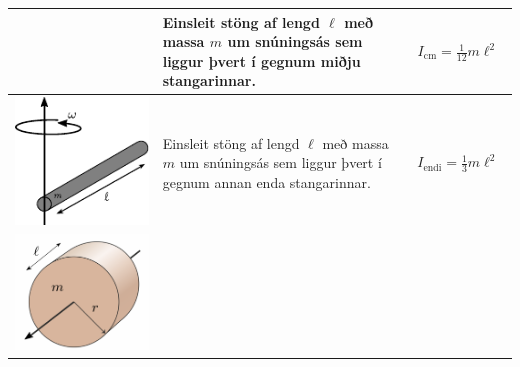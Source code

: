 \begin{table}[h!]
\begin{tabular}{ | c | m{5cm} | m{5cm} | }
\begin{minipage}{.3\textwidth}
      \vspace{0.3cm}
    \end{minipage}
    &
      Einsleit stöng af lengd $\ell$ með massa $m$ um snúningsás sem liggur þvert í gegnum miðju stangarinnar.
    & 
      \begin{align*}
          I_{\text{cm}} = \frac{1}{12}m\ell^2
      \end{align*}
    \\ \hline
            \begin{minipage}{.27\textwidth}
        \vspace{0.3cm}
    \centering
      \includegraphics[width=0.75\linewidth]{momentsOfInertia/Moment_of_inertia_rod_end.pdf}
      \vspace{0.3cm}
    \end{minipage}
    &
      Einsleit stöng af lengd $\ell$ með massa $m$ um snúningsás sem liggur þvert í gegnum annan enda stangarinnar.
    & 
      \begin{align*}
          I_{\text{endi}} = \frac{1}{3}m\ell^2
      \end{align*}
    \\ \hline
                        \begin{minipage}{.3\textwidth}
        \vspace{0.3cm}
    \centering
      \includegraphics[width=0.75\linewidth]{momentsOfInertia/gsivaln.pdf}

\end{minipage}
\end{tabular}
\end{table}
